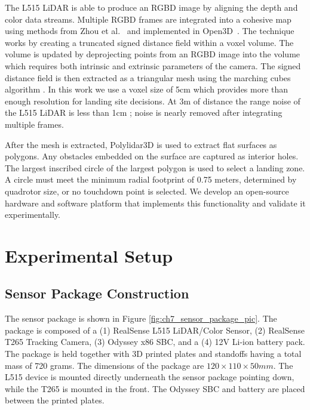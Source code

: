The L515 LiDAR is able to produce an \ac{RGBD} image by aligning  the depth and color data streams. Multiple \ac{RGBD} frames are integrated into a cohesive map using methods from Zhou et al.~\cite{zhou_dense_2013} and implemented in Open3D~\cite{zhou_open3d_2018}. The technique works by creating a truncated signed distance field within a voxel volume.  The volume is updated by deprojecting points from an RGBD image into the volume which requires both intrinsic and extrinsic parameters of the camera. The signed distance field is then extracted as a triangular mesh using the marching cubes algorithm \cite{10.1145/37401.37422}.  In this work we use a voxel size of 5cm which provides more than enough resolution for landing site decisions. At 3m of distance the range noise of the L515 LiDAR is less than 1cm \cite{nxp:tja1043}; noise is nearly removed after integrating multiple frames.

After the mesh is extracted, Polylidar3D is used to extract flat surfaces as polygons. Any obstacles embedded on the surface are captured as interior holes. The largest inscribed circle of the largest polygon is used to select a landing zone.  A circle must meet the minimum radial footprint of 0.75 meters, determined by quadrotor size, or no touchdown point is selected. We develop an open-source hardware and software platform that implements this functionality and validate it experimentally.


\section{Experimental Setup}

\subsection{Sensor Package Construction}

The sensor package is shown in Figure \ref{fig:ch7_sensor_package_pic}. The package is composed of a (1) RealSense L515 LiDAR/Color Sensor, (2) RealSense T265 Tracking Camera, (3) Odyssey x86 \ac{SBC}, and a (4) 12V Li-ion battery pack. The package is held together with 3D printed plates and standoffs having a total mass of 720 grams. The dimensions of the package are $120 \times 110 \times 50 mm$. The L515 device is mounted directly underneath the sensor package pointing down, while the T265 is mounted in the front. The Odyssey \ac{SBC} and battery are placed between the printed plates.

